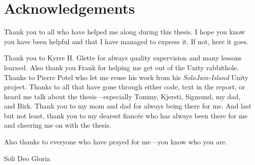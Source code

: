 \chapter*{Acknowledgements} %

Thank you to all who have helped me along during this thesis. I hope you know you have been helpful and that I have managed to express it. If not, here it goes. 

Thank you to Kyrre H. Glette for always quality supervision and many lessons learned. Also thank you Frank for helping me get out of the Unity rabbithole. Thanks to Pierre Potel who let me reuse his work from his \textit{SoloJam-Island} Unity project. Thanks to all that have gone through either code, text in the report, or heard me talk about the thesis—especially Tommy, Kjersti, Sigmund, my dad, and Birk. Thank you to my mom and dad for always being there for me. And last but not least, thank you to my dearest fiancée who has always been there for me and cheering me on with the thesis.

Also thanks to everyone who have prayed for me—you know who you are. \nl

{\huge \gothfamily Soli Deo Gloria}